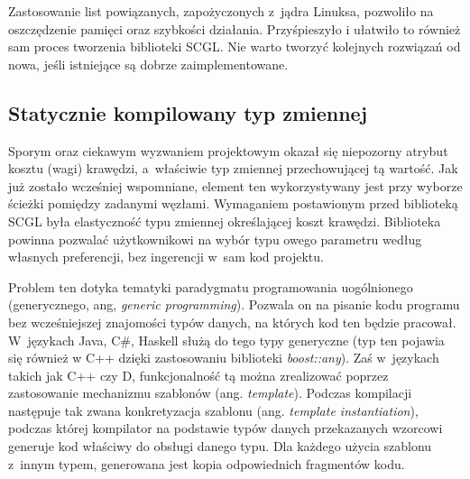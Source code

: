 \documentclass[a4paper,12pt,polish,oneside,openright]{thesis}
\begin{document}
Zastosowanie list powiązanych, zapożyczonych z~jądra Linuksa, pozwoliło na oszczędzenie pamięci oraz szybkości działania.
Przyśpieszyło i ułatwiło to również sam proces tworzenia biblioteki SCGL.
Nie warto tworzyć kolejnych rozwiązań od nowa, jeśli istniejące są dobrze zaimplementowane.

\subsection{Statycznie kompilowany typ zmiennej}
\label{chap:costtype}
Sporym oraz ciekawym wyzwaniem projektowym okazał się niepozorny atrybut kosztu (wagi) krawędzi, a~właściwie typ zmiennej przechowującej tą wartość.
Jak już zostało wcześniej wspomniane, element ten wykorzystywany jest przy wyborze ścieżki pomiędzy zadanymi węzłami.
Wymaganiem postawionym przed biblioteką SCGL była elastyczność typu zmiennej określającej koszt krawędzi.
Biblioteka powinna pozwalać użytkownikowi na wybór typu owego parametru według własnych preferencji, bez ingerencji w~sam kod projektu.

Problem ten dotyka tematyki paradygmatu programowania uogólnionego (generycznego, ang, \emph{generic programming}).
Pozwala on na pisanie kodu programu bez wcześniejszej znajomości typów danych, na których kod ten będzie pracował.
W~językach Java, C\#, Haskell służą do tego typy generyczne (typ ten pojawia się również w C++ dzięki zastosowaniu biblioteki \emph{boost::any}).
Zaś w~językach takich jak C++ czy D, funkcjonalność tą można zrealizować poprzez zastosowanie mechanizmu szablonów (ang. \emph{template}).
Podczas kompilacji następuje tak zwana konkretyzacja szablonu (ang. \emph{template instantiation}), podczas której kompilator na podstawie typów danych przekazanych wzorcowi generuje kod właściwy do obsługi danego typu.
Dla każdego użycia szablonu z~innym typem, generowana jest kopia odpowiednich fragmentów kodu.
\end{document}
